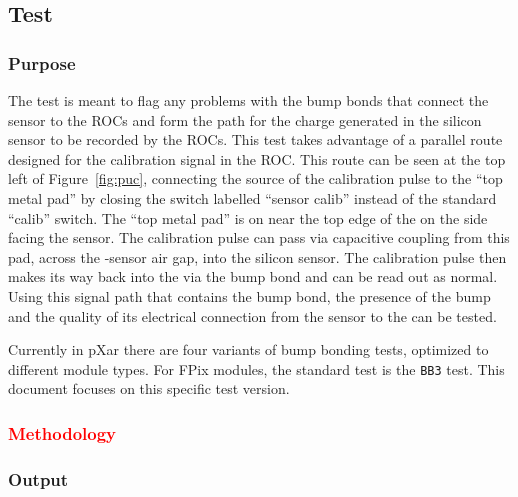 
\newpage

\subsection{\bb Test}
\label{ss:bb}

\subsubsection{Purpose}

The \bb test is meant to flag any problems with the bump bonds that connect the sensor to the ROCs
and form the path for the charge generated in the silicon sensor to be recorded by the ROCs.
This test takes advantage of a parallel route designed for the calibration signal in the ROC.
This route can be seen at the top left of Figure~\ref{fig:puc}, 
connecting the source of the \vcal calibration pulse to the ``top metal pad'' 
by closing the switch labelled ``sensor calib'' instead of the standard ``calib'' switch.
The ``top metal pad'' is on near the top edge of the \roc on the side facing the sensor.
The calibration pulse can pass via capacitive coupling from this pad, 
across the \roc-sensor air gap, into the silicon sensor.
The calibration pulse then makes its way back into the \roc via the bump bond and can be read out as normal.
Using this signal path that contains the bump bond, 
the presence of the bump and the quality of its electrical connection from the sensor to the \roc can be tested.

Currently in pXar there are four variants of bump bonding tests, optimized to different module types.  
For FPix modules, the standard test is the {\tt BB3} test.
This document focuses on this specific \bb test version.

\subsubsection{\textcolor{red}{Methodology}}



\subsubsection{Output}


